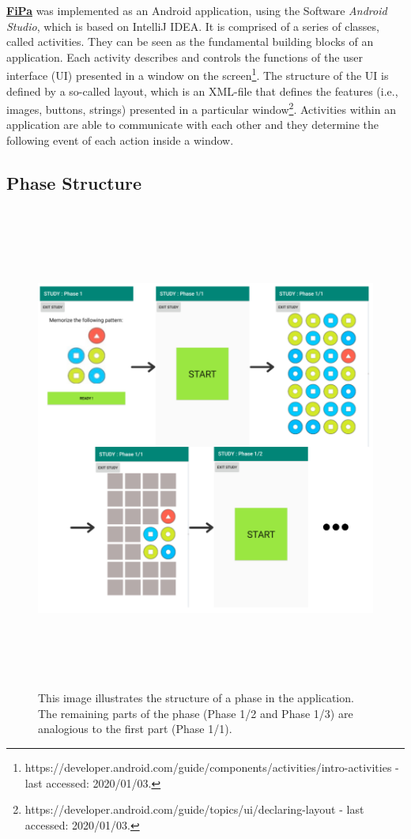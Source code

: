 \underline{\textbf{FiPa}} was implemented as an Android application, using the Software \textit{Android Studio}, which is based on IntelliJ IDEA. It is comprised of a series of classes, called activities. They can be seen as the fundamental building blocks of an application. Each activity describes and controls the functions of the user interface (UI) presented in a window on the screen\footnote{https://developer.android.com/guide/components/activities/intro-activities - last accessed: 2020/01/03.}. The structure of the UI is defined by a so-called layout, which is an XML-file that defines the features (i.e., images, buttons, strings) presented in a particular window\footnote{https://developer.android.com/guide/topics/ui/declaring-layout - last accessed: 2020/01/03.}. Activities within an application are able to communicate with each other and they determine the following event of each action inside a window. 


\subsection{Phase Structure} \label{4.3.1}

\begin{figure}[t!]
\centering
\includegraphics[width=15cm, height=16cm]{Chapters/graphics/phase.PNG}
\caption{This image illustrates the structure of a phase in the application. The remaining parts of the phase (Phase 1/2 and Phase 1/3) are analogious to the first part (Phase 1/1).}
\label{fig:appphase}
\end{figure}

